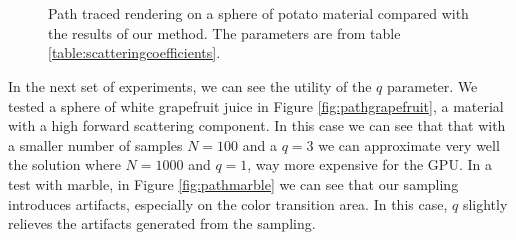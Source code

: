 \begin{figure}
{}
 \\
 \\
\caption{Path traced rendering on a sphere of potato material compared with the results of our method. The parameters are from table \ref{table:scatteringcoefficients}.}
\label{fig:pathpotato}
\end{figure}
 
In the next set of experiments, we can see the utility of the $q$ parameter. We tested a sphere of white grapefruit juice in Figure \ref{fig:pathgrapefruit}, a material with a high forward scattering component. In this case we can see that that with a smaller number of samples $N = 100$ and a $q = 3$ we can approximate very well the solution where $N = 1000$ and $q = 1$, way more expensive for the GPU. In a test with marble, in Figure \ref{fig:pathmarble} we can see that our sampling introduces artifacts, especially on the color transition area. In this case, $q$ slightly relieves the artifacts generated from the sampling.

